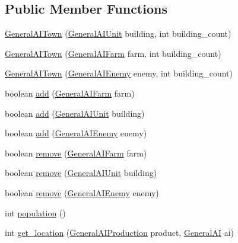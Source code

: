 \subsection*{Public Member Functions}
\begin{DoxyCompactItemize}
\item 
\hyperlink{classai_1_1general_1_1_general_a_i_town_aa9fcb43b63a8aaebbfd5a1796deda688}{GeneralAITown} (\hyperlink{classai_1_1general_1_1_general_a_i_unit}{GeneralAIUnit} building, int building\_\-count)
\item 
\hyperlink{classai_1_1general_1_1_general_a_i_town_a99a564402ec35f68afaa251e472790ec}{GeneralAITown} (\hyperlink{classai_1_1general_1_1_general_a_i_farm}{GeneralAIFarm} farm, int building\_\-count)
\item 
\hyperlink{classai_1_1general_1_1_general_a_i_town_a71bbf617804dcd2a1b51dfa8c4a48e76}{GeneralAITown} (\hyperlink{classai_1_1general_1_1_general_a_i_enemy}{GeneralAIEnemy} enemy, int building\_\-count)
\item 
boolean \hyperlink{classai_1_1general_1_1_general_a_i_town_ad8d983190f387b9058de7eb64354a901}{add} (\hyperlink{classai_1_1general_1_1_general_a_i_farm}{GeneralAIFarm} farm)
\item 
boolean \hyperlink{classai_1_1general_1_1_general_a_i_town_ae44f51c883bcc4263ee49583634f9cea}{add} (\hyperlink{classai_1_1general_1_1_general_a_i_unit}{GeneralAIUnit} building)
\item 
boolean \hyperlink{classai_1_1general_1_1_general_a_i_town_aa4e1adb754f46beae752a0acd8a8b9d8}{add} (\hyperlink{classai_1_1general_1_1_general_a_i_enemy}{GeneralAIEnemy} enemy)
\item 
boolean \hyperlink{classai_1_1general_1_1_general_a_i_town_af7b49789f6b599a39471989a1e425efd}{remove} (\hyperlink{classai_1_1general_1_1_general_a_i_farm}{GeneralAIFarm} farm)
\item 
boolean \hyperlink{classai_1_1general_1_1_general_a_i_town_a2d256254f6a203b08fdb96ad66a2907d}{remove} (\hyperlink{classai_1_1general_1_1_general_a_i_unit}{GeneralAIUnit} building)
\item 
boolean \hyperlink{classai_1_1general_1_1_general_a_i_town_a9b80df5d8a2250e252f415a855890752}{remove} (\hyperlink{classai_1_1general_1_1_general_a_i_enemy}{GeneralAIEnemy} enemy)
\item 
int \hyperlink{classai_1_1general_1_1_general_a_i_town_a0d09e35b914616e11d99934cb327c2c9}{population} ()
\item 
int \hyperlink{classai_1_1general_1_1_general_a_i_town_a462cce5a13f0e139d8e3f33dad8d38ac}{get\_\-location} (\hyperlink{classai_1_1general_1_1_general_a_i_production}{GeneralAIProduction} product, \hyperlink{classai_1_1general_1_1_general_a_i}{GeneralAI} ai)

\end{DoxyCompactItemize}
